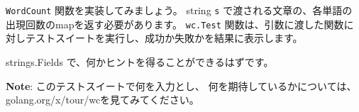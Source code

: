 \texttt{WordCount} 関数を実装してみましょう。
string \texttt{s} で渡される文章の、各単語の
出現回数のmapを返す必要があります。 
\texttt{wc.Test} 関数は、引数に渡した関数に
対しテストスイートを実行し、成功か失敗かを結果に表示します。

strings.Fields で、何かヒントを得ることができるはずです。

\textbf{Note}: このテストスイートで何を入力とし、
何を期待しているかについては、golang.org/x/tour/wcを見てみてください。